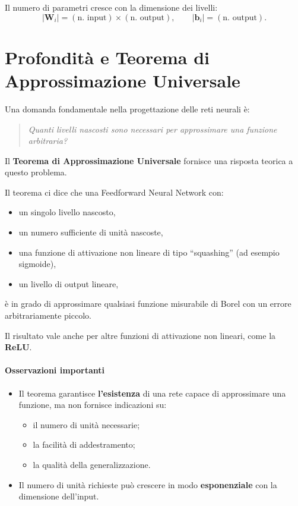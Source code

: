 \documentclass[a4paper,12pt]{report}
\begin{document}
Il numero di parametri cresce con la dimensione dei livelli:
\[
|\mathbf{W}_i| = (\text{n. input}) \times (\text{n. output}), 
\qquad
|\mathbf{b}_i| = (\text{n. output}).
\]

\section{Profondità e Teorema di Approssimazione Universale}

Una domanda fondamentale nella progettazione delle reti neurali è:
\begin{quote}
\textit{Quanti livelli nascosti sono necessari per approssimare una funzione arbitraria?}
\end{quote}

Il \textbf{Teorema di Approssimazione Universale} fornisce una risposta teorica a questo problema.

Il teorema ci dice che una Feedforward Neural Network con:
\begin{itemize}
    \item un singolo livello nascosto,
    \item un numero sufficiente di unità nascoste,
    \item una funzione di attivazione non lineare di tipo “squashing” (ad esempio sigmoide),
    \item un livello di output lineare,
\end{itemize}
è in grado di approssimare qualsiasi funzione misurabile di Borel con un errore arbitrariamente piccolo.

Il risultato vale anche per altre funzioni di attivazione non lineari, come la \textbf{ReLU}.

\paragraph{Osservazioni importanti}
\begin{itemize}
    \item Il teorema garantisce \textbf{l’esistenza} di una rete capace di approssimare una funzione, ma non fornisce indicazioni su:
    \begin{itemize}
        \item il numero di unità necessarie;
        \item la facilità di addestramento;
        \item la qualità della generalizzazione.
    \end{itemize}
    \item Il numero di unità richieste può crescere in modo \textbf{esponenziale} con la dimensione dell’input.
\end{itemize}
\end{document}
